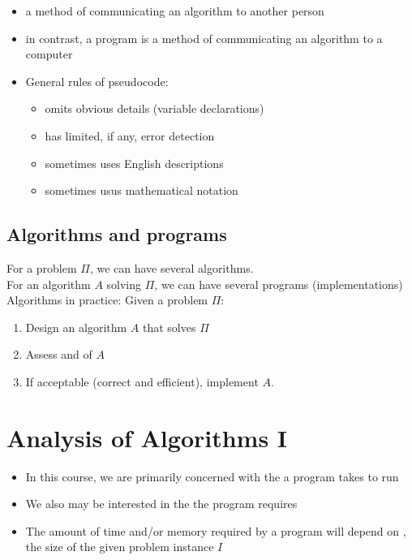 \documentclass[letterpaper, 12pt]{article}
\newcommand{\red}[1]{{\color{red}{#1}}}
\begin{document}
    \red{Pseudocode}
    \begin{itemize}
        \item a method of communicating an algorithm to another person
        \item in contrast, a program is a method of communicating an algorithm to a computer
        \item General rules of pseudocode:
        \begin{itemize}
            \item omits obvious details (variable declarations)
            \item has limited, if any, error detection
            \item sometimes uses English descriptions
            \item sometimes usus mathematical notation
        \end{itemize}
    \end{itemize}
    \pagebreak
    \subsection{Algorithms and programs}
    For a problem $\Pi$, we can have several algorithms.\\
    For an algorithm $A$ solving $\Pi$, we can have several programs (implementations)\\
    \bigskip
    Algorithms in practice: Given a problem $\Pi$:\\
    \begin{enumerate}
        \item \textbf{\red{Algorithm Design:}} Design an algorithm $A$ that solves $\Pi$
        \item \textbf{\red{Algorithm Analysis:}} Assess \red{correctness} and \red{efficiency} of $A$
        \item If acceptable (correct and efficient), implement $A$.
    \end{enumerate}
    \pagebreak

    \section{Analysis of Algorithms I}
    \begin{itemize}
        \item \textbf{\red{Running Time:}} In this course, we are primarily concerned with the \red{amount of time} a program takes to run
        \item \textbf{\red{Space:}} We also may be interested in the \red{amount of memory} the program requires
        \item The amount of time and/or memory required by a program will depend on \red{$Size(I)$}, the size of the given problem instance $I$
    \end{itemize}
\end{document}

